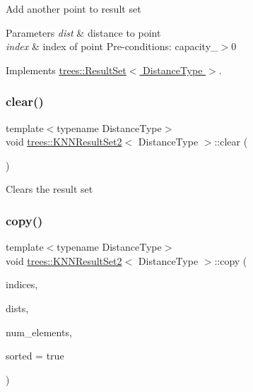 Add another point to result set 
\begin{DoxyParams}{Parameters}
{\em dist} & distance to point \\
\hline
{\em index} & index of point Pre-\/conditions\+: capacity\+\_\+$>$0 \\
\hline
\end{DoxyParams}


Implements \hyperlink{classtrees_1_1_result_set}{trees\+::\+Result\+Set$<$ Distance\+Type $>$}.

\mbox{\label{classtrees_1_1_k_n_n_result_set2_aedf33272f0b7247f3099e37129cf5aaf}} 
\subsubsection{\texorpdfstring{clear()}{clear()}}
{\footnotesize\ttfamily template$<$typename Distance\+Type$>$ \\
void \hyperlink{classtrees_1_1_k_n_n_result_set2}{trees\+::\+K\+N\+N\+Result\+Set2}$<$ Distance\+Type $>$\+::clear (\begin{DoxyParamCaption}{ }\end{DoxyParamCaption})\hspace{0.3cm}{\ttfamily [inline]}}

Clears the result set \mbox{\label{classtrees_1_1_k_n_n_result_set2_aeb8e99886bd18708719c90f22a8d1956}} 
\subsubsection{\texorpdfstring{copy()}{copy()}}
{\footnotesize\ttfamily template$<$typename Distance\+Type$>$ \\
void \hyperlink{classtrees_1_1_k_n_n_result_set2}{trees\+::\+K\+N\+N\+Result\+Set2}$<$ Distance\+Type $>$\+::copy (\begin{DoxyParamCaption}\item[{size\+\_\+t $\ast$}]{indices,  }\item[{Distance\+Type $\ast$}]{dists,  }\item[{size\+\_\+t}]{num\+\_\+elements,  }\item[{bool}]{sorted = {\ttfamily true} }\end{DoxyParamCaption})\hspace{0.3cm}{\ttfamily [inline]}}

